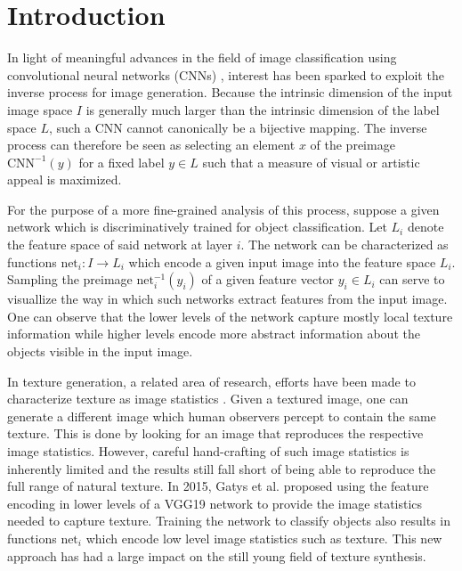 
\section{Introduction}
\label{section:introduction}


In light of meaningful advances in the field of image classification using convolutional neural networks (CNNs) \cite{vgg2014}, interest has been sparked to exploit the inverse process for image generation. Because the intrinsic dimension of the input image space \(I\) is generally much larger than the intrinsic dimension of the label space \(L\), such a CNN cannot canonically be a bijective mapping. The inverse process can therefore be seen as selecting an element \(x\) of the preimage \(\mathrm{CNN}^{-1}(y)\) for a fixed label \(y\in L\) such that a measure of visual or artistic appeal is maximized.

For the purpose of a more fine-grained analysis of this process, suppose a given network which is discriminatively trained for object classification. Let \(L_i\) denote the feature space of said network at layer \(i\). The network can be characterized as functions \(\text{net}_i\colon I \to L_i\) which encode a given input image into the feature space \(L_i\). Sampling the preimage \(\text{net}_i^{-1}(y_i)\) of a given feature vector \(y_i\in L_i\) can serve to visuallize the way in which such networks extract features from the input image. One can observe that the lower levels of the network capture mostly local texture information while higher levels encode more abstract information about the objects visible in the input image.


In texture generation, a related area of research, efforts have been made to characterize texture as image statistics \cite{julesz1962visual,heeger1995pyramid,rosenholtz2012summary}. Given a textured image, one can generate a different image which human observers percept to contain the same texture. This is done by looking for an image that reproduces the respective image statistics. However, careful hand-crafting of such image statistics is inherently limited and the results still fall short of being able to reproduce the full range of natural texture. In 2015, Gatys et al. \cite{gatys2015texture} proposed using the feature encoding in lower levels of a VGG19 network \cite{vgg2014} to provide the image statistics needed to capture texture. Training the network to classify objects also results in functions \(\text{net}_i\) which encode low level image statistics such as texture. This new approach has had a large impact on the still young field of texture synthesis.

